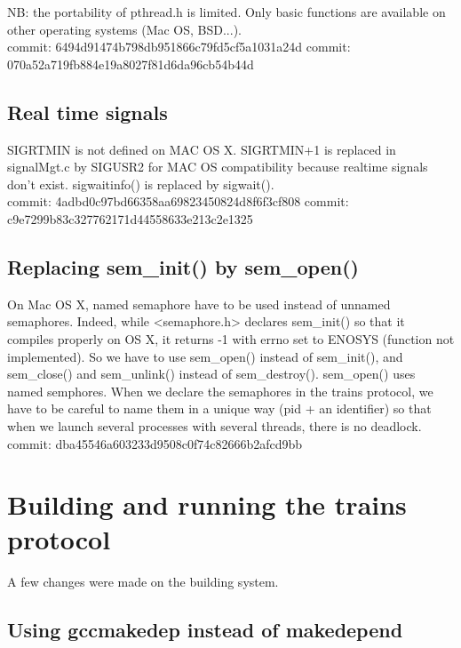 \documentclass[a4paper,10pt]{report}
\begin{document}
    NB: the portability of pthread.h is limited. Only basic functions are
    available on other operating systems (Mac OS, BSD...).\\
    
    commit: 6494d91474b798db951866c79fd5cf5a1031a24d
    commit: 070a52a719fb884e19a8027f81d6da96cb54b44d 
    

\subsection{Real time signals}
    SIGRTMIN is not defined on MAC OS X.
    SIGRTMIN+1 is replaced in signalMgt.c by SIGUSR2 for MAC OS
    compatibility because realtime signals don't exist.
    sigwaitinfo() is replaced by sigwait().\\

    commit: 4adbd0c97bd66358aa69823450824d8f6f3cf808
    commit: c9e7299b83c327762171d44558633e213c2e1325

\subsection{Replacing sem\_init() by sem\_open()}
    
    On Mac OS X, named semaphore have to be used instead of unnamed
    semaphores. Indeed, while <semaphore.h> declares sem\_init() so that it
    compiles properly on OS X, it returns -1 with errno set to ENOSYS
    (function not implemented).
    So we have to use sem\_open() instead of sem\_init(), and sem\_close() and
    sem\_unlink() instead of sem\_destroy().
    sem\_open() uses named semphores. When we declare the semaphores in the trains protocol, 
    we have to be careful to name them in a unique way (pid + an identifier) so that when we launch
    several processes with several threads, there is no deadlock.\\
 
    commit: dba45546a603233d9508c0f74c82666b2afcd9bb

\section{Building and running the trains protocol}

A few changes were made on the building system.

\subsection{Using gccmakedep instead of makedepend} 
\end{document}
